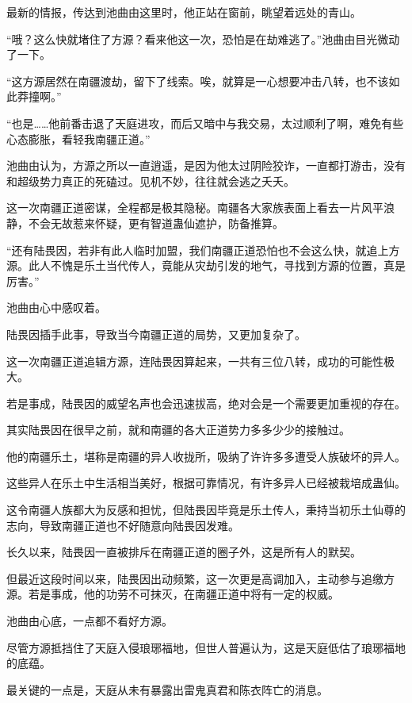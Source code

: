 
\begin{this_body}

最新的情报，传达到池曲由这里时，他正站在窗前，眺望着远处的青山。

“哦？这么快就堵住了方源？看来他这一次，恐怕是在劫难逃了。”池曲由目光微动了一下。

“这方源居然在南疆渡劫，留下了线索。唉，就算是一心想要冲击八转，也不该如此莽撞啊。”

“也是……他前番击退了天庭进攻，而后又暗中与我交易，太过顺利了啊，难免有些心态膨胀，看轻我南疆正道。”

池曲由认为，方源之所以一直逍遥，是因为他太过阴险狡诈，一直都打游击，没有和超级势力真正的死磕过。见机不妙，往往就会逃之夭夭。

这一次南疆正道密谋，全程都是极其隐秘。南疆各大家族表面上看去一片风平浪静，不会无故惹来怀疑，更有智道蛊仙遮护，防备推算。

“还有陆畏因，若非有此人临时加盟，我们南疆正道恐怕也不会这么快，就追上方源。此人不愧是乐土当代传人，竟能从灾劫引发的地气，寻找到方源的位置，真是厉害。”

池曲由心中感叹着。

陆畏因插手此事，导致当今南疆正道的局势，又更加复杂了。

这一次南疆正道追辑方源，连陆畏因算起来，一共有三位八转，成功的可能性极大。

若是事成，陆畏因的威望名声也会迅速拔高，绝对会是一个需要更加重视的存在。

其实陆畏因在很早之前，就和南疆的各大正道势力多多少少的接触过。

他的南疆乐土，堪称是南疆的异人收拢所，吸纳了许许多多遭受人族破坏的异人。

这些异人在乐土中生活相当美好，根据可靠情况，有许多异人已经被栽培成蛊仙。

这令南疆人族都大为反感和担忧，但陆畏因毕竟是乐土传人，秉持当初乐土仙尊的志向，导致南疆正道也不好随意向陆畏因发难。

长久以来，陆畏因一直被排斥在南疆正道的圈子外，这是所有人的默契。

但最近这段时间以来，陆畏因出动频繁，这一次更是高调加入，主动参与追缴方源。若是事成，他的功劳不可抹灭，在南疆正道中将有一定的权威。

池曲由心底，一点都不看好方源。

尽管方源抵挡住了天庭入侵琅琊福地，但世人普遍认为，这是天庭低估了琅琊福地的底蕴。

最关键的一点是，天庭从未有暴露出雷鬼真君和陈衣阵亡的消息。


\end{this_body}
